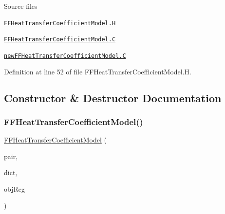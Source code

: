\begin{DoxyParagraph}{Source files}

\begin{DoxyItemize}
\item \href{../../../home/carlo/data/GeN-Foam/GeN-Foam_ffn/GeN-Foam/GeN-Foam/classes/thermalHydraulics/src/physicsModels/heatTransferModels/FFHeatTransferCoefficientModels/FFHeatTransferCoefficientModel.H}{\tt F\+F\+Heat\+Transfer\+Coefficient\+Model.\+H} 
\item \href{../../../home/carlo/data/GeN-Foam/GeN-Foam_ffn/GeN-Foam/GeN-Foam/classes/thermalHydraulics/src/physicsModels/heatTransferModels/FFHeatTransferCoefficientModels/FFHeatTransferCoefficientModel.C}{\tt F\+F\+Heat\+Transfer\+Coefficient\+Model.\+C} 
\item \href{../../../home/carlo/data/GeN-Foam/GeN-Foam_ffn/GeN-Foam/GeN-Foam/classes/thermalHydraulics/src/physicsModels/heatTransferModels/FFHeatTransferCoefficientModels/newFFHeatTransferCoefficientModel.C}{\tt new\+F\+F\+Heat\+Transfer\+Coefficient\+Model.\+C} 
\end{DoxyItemize}
\end{DoxyParagraph}


Definition at line 52 of file F\+F\+Heat\+Transfer\+Coefficient\+Model.\+H.



\subsection{Constructor \& Destructor Documentation}
\mbox{\label{classFoam_1_1FFHeatTransferCoefficientModel_aa4fd467c2a7d78fcd00dc9ef3371fdbe}} 
\subsubsection{\texorpdfstring{F\+F\+Heat\+Transfer\+Coefficient\+Model()}{FFHeatTransferCoefficientModel()}}
{\footnotesize\ttfamily \hyperlink{classFoam_1_1FFHeatTransferCoefficientModel}{F\+F\+Heat\+Transfer\+Coefficient\+Model} (\begin{DoxyParamCaption}\item[{const \hyperlink{classFoam_1_1FFPair}{F\+F\+Pair} \&}]{pair,  }\item[{const dictionary \&}]{dict,  }\item[{const object\+Registry \&}]{obj\+Reg }\end{DoxyParamCaption})}



